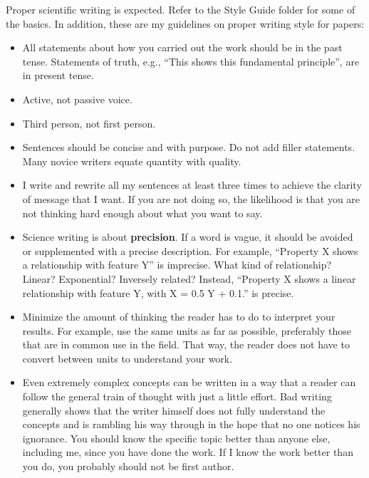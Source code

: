 \documentclass[manuscript=article]{achemso}
\begin{document}
Proper scientific writing is expected. Refer to the Style Guide folder for some of the basics. In addition, these are my guidelines on proper writing style for papers:
\begin{itemize}
\item All statements about how you carried out the work should be in the past tense. Statements of truth, e.g., ``This shows this fundamental principle'', are in present tense. 
\item Active, not passive voice.
\item Third person, not first person.
\item Sentences should be concise and with purpose. Do not add filler statements. Many novice writers equate quantity with quality. 
\item I write and rewrite all my sentences at least three times to achieve the clarity of message that I want. If you are not doing so, the likelihood is that you are not thinking hard enough about what you want to say.
\item Science writing is about \textbf{precision}. If a word is vague, it should be avoided or supplemented with a precise description. For example, ``Property X shows a relationship with feature Y'' is imprecise. What kind of relationship? Linear? Exponential? Inversely related? Instead, ``Property X shows a linear relationship with feature Y, with X = 0.5 Y + 0.1.'' is precise.
\item Minimize the amount of thinking the reader has to do to interpret your results. For example, use the same units as far as possible, preferably those that are in common use in the field. That way, the reader does not have to convert between units to understand your work.
\item Even extremely complex concepts can be written in a way that a reader can follow the general train of thought with just a little effort. Bad writing generally shows that the writer himself does not fully understand the concepts and is rambling his way through in the hope that no one notices his ignorance. You should know the specific topic better than anyone else, including me, since you have done the work. If I know the work better than you do, you probably should not be first author.
\end{itemize}


\end{document}
